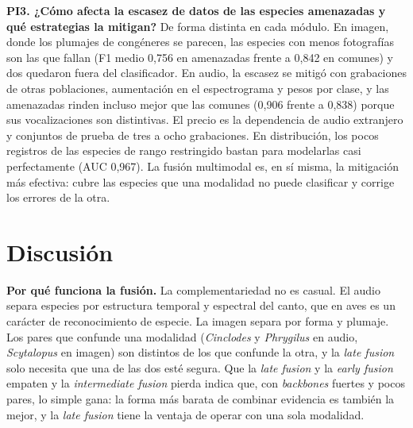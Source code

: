 \textbf{PI3. ¿Cómo afecta la escasez de datos de las especies amenazadas y
qué estrategias la mitigan?} De forma distinta en cada módulo. En imagen,
donde los plumajes de congéneres se parecen, las especies con menos
fotografías son las que fallan (F1 medio 0,756 en amenazadas frente a 0,842
en comunes) y dos quedaron fuera del clasificador. En audio, la escasez se
mitigó con grabaciones de otras poblaciones, aumentación en el espectrograma
y pesos por clase, y las amenazadas rinden incluso mejor que las comunes
(0,906 frente a 0,838) porque sus vocalizaciones son distintivas. El precio
es la dependencia de audio extranjero y conjuntos de prueba de tres a ocho
grabaciones. En distribución, los pocos registros de las especies de rango
restringido bastan para modelarlas casi perfectamente (AUC 0,967). La fusión
multimodal es, en sí misma, la mitigación más efectiva: cubre las especies
que una modalidad no puede clasificar y corrige los errores de la otra.

\section{Discusión}\label{sec:discusion}

\textbf{Por qué funciona la fusión.} La complementariedad no es casual. El
audio separa especies por estructura temporal y espectral del canto, que en
aves es un carácter de reconocimiento de especie. La imagen separa por forma
y plumaje. Los pares que confunde una modalidad (\textit{Cinclodes} y
\textit{Phrygilus} en audio, \textit{Scytalopus} en imagen) son distintos de
los que confunde la otra, y la \textit{late fusion} solo necesita que una de las dos
esté segura. Que la \textit{late fusion} y la \textit{early fusion} empaten y
la \textit{intermediate fusion} pierda indica que, con \textit{backbones}
fuertes y pocos pares, lo simple gana: la forma más barata de combinar
evidencia es también la mejor, y la \textit{late fusion} tiene la ventaja de
operar con una sola modalidad.

